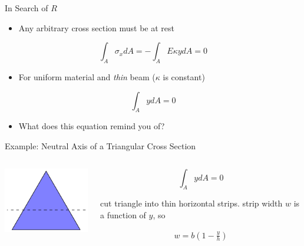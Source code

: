 \documentclass[10pt, svgnames]{beamer}
\begin{document}
\begin{frame}[label={sec:org07b7d44}]{In Search of \(R\)}
\begin{itemize}
\item Any arbitrary cross section must be at rest
\end{itemize}

\[\int_A \sigma_x dA = - \int_A E \kappa y dA = 0\]

\begin{itemize}
\item For uniform material and \emph{thin} beam (\(\kappa\) is constant)
\end{itemize}

\[\int_A y dA = 0\]

\begin{itemize}
\item What does this equation remind you of?
\end{itemize}
\end{frame}

\begin{frame}[label={sec:orge38fdc3}]{Example: Neutral Axis of a Triangular Cross Section}
\begin{columns}
\begin{column}{0.3\columnwidth}
\begin{center}
\includegraphics[width=\textwidth]{./pictures/triangular-section-axis.pdf}
\end{center}
\end{column}

\begin{column}{0.6\columnwidth}
\[\int_A y dA = 0\]

cut triangle into thin horizontal strips. strip
width \(w\) is a function of \(y\), so

\begin{align*}
        w = b \left( 1 - \frac{y}{h} \right)
\end{align*}
\end{column}
\end{columns}
\end{frame}
\end{document}

